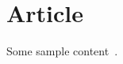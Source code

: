 \documentclass[
	pdftex,
	oneside,
	12pt,
	parskip=half,
	footheight = 16pt,	
	DIV=calc
]{article}
\begin{document}
	
	\section*{Article}

	Some sample content~\cite{lit}.
  
    \printbibliography

	\clearpage
	
\end{document}
